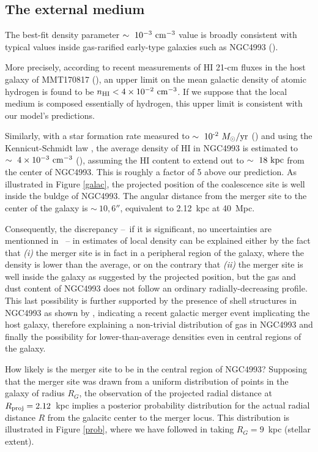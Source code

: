 \subsection{The external medium}
The best-fit density parameter $\sim~10^{-3}~\rm{cm}^{-3}$ value is broadly consistent with typical values inside gas-rarified early-type galaxies such as NGC4993 (\cite{44}).

More precisely, according to recent measurements of HI 21-cm fluxes in the host galaxy of MMT170817 (\cite{12}), an upper limit on the mean galactic density of atomic hydrogen is found to be $n_{\rm{HI}} < 4 \times 10^{-2}~\rm{cm}^{-3}$. If we suppose that the local medium is composed essentially of hydrogen, this upper limit is consistent with our model's predictions.

Similarly, with a star formation rate measured to $\sim~10\sp{-2}~\Ms/\rm{yr}$ (\cite{9}) and using the Kennicut-Schmidt law  \cite{43}, the average density of HI in NGC4993 is estimated to $\sim~4 \times 10^{-3}~\rm{cm}^{-3}$ (\cite{12}), assuming the HI content to extend out to $\sim~18~\rm{kpc}$ from the center of NGC4993. This is roughly a factor of 5 above our prediction. As illustrated in Figure \ref{galac}, the projected position of the coalescence site is well inside the buldge of NGC4993. The angular distance from the merger site to the center of the galaxy is $\sim~10,6''$, equivalent to 2.12~kpc at 40~Mpc.

Consequently, the discrepancy --~if it is significant, no uncertainties are mentionned in \cite{12}~-- in estimates of local density can be explained either by the fact that \textit{(i)} the merger site is in fact in a peripheral region of the galaxy, where the density is lower than the average, or on the contrary that \textit{(ii)} the merger site is well inside the galaxy as suggested by the projected position, but the gas and dust content of NGC4993 does not follow an ordinary radially-decreasing profile. This last possibility is further supported by the presence of shell structures in NGC4993 as shown by \cite{33}, indicating a recent galactic merger event implicating the host galaxy, therefore explaining a non-trivial distribution of gas in NGC4993 and finally the possibility for lower-than-average densities even in central regions of the galaxy.

How likely is the merger site to be in the central region of NGC4993? Supposing that the merger site was drawn from a uniform distribution of points in the galaxy of radius $R_G$, the observation of the projected radial distance at $R_\rm{proj} = 2.12$~kpc implies a posterior probability distribution for the actual radial distance $R$ from the galacitc center to the merger locus. This distribution is illustrated in Figure \ref{prob}, where we have followed \cite{12} in taking $R_G = 9$~kpc (stellar extent).

